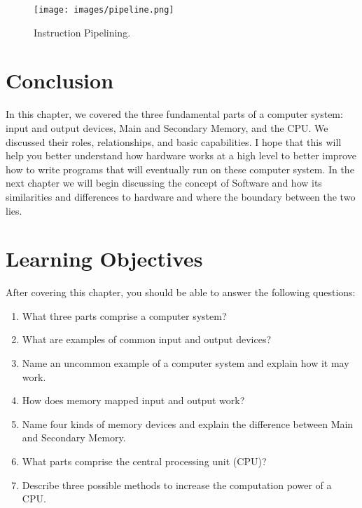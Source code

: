 \begin{figure}
	\centering
	\texttt{[image: images/pipeline.png]}
	\caption{Instruction Pipelining. }
	\label{fig:hardware:pipeline}
\end{figure}


\section {Conclusion}
In this chapter, we covered the three fundamental parts of a computer system:
input and output devices, Main and Secondary Memory, and the CPU. We discussed
their roles, relationships, and basic capabilities. I hope that this will help
you better understand how hardware works at a high level to better improve how
to write programs that will eventually run on these computer system. In the
next chapter we will begin discussing the concept of Software and how its
similarities and differences to hardware and where the boundary between the two
lies.

\section {Learning Objectives}
 After covering this chapter, you should be able to answer the following questions:

\begin{enumerate}
\item What three parts comprise a computer system?
\item What are examples of common input and output devices?
\item Name an uncommon example of a computer system and explain how it may work.
\item How does memory mapped input and output work?
\item Name four kinds of memory devices and explain the difference between Main and Secondary Memory.
\item What parts comprise the central processing unit (CPU)?
\item Describe three possible methods to increase the computation power of a CPU.
\end{enumerate}
